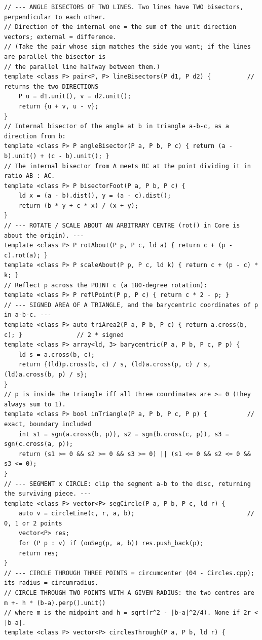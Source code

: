 \documentclass[9pt,a4paper,twocolumn]{extarticle}
\begin{document}
\begin{lstlisting}
// --- ANGLE BISECTORS OF TWO LINES. Two lines have TWO bisectors, perpendicular to each other.
// Direction of the internal one = the sum of the unit direction vectors; external = difference.
// (Take the pair whose sign matches the side you want; if the lines are parallel the bisector is
// the parallel line halfway between them.)
template <class P> pair<P, P> lineBisectors(P d1, P d2) {          // returns the two DIRECTIONS
    P u = d1.unit(), v = d2.unit();
    return {u + v, u - v};
}
// Internal bisector of the angle at b in triangle a-b-c, as a direction from b:
template <class P> P angleBisector(P a, P b, P c) { return (a - b).unit() + (c - b).unit(); }
// The internal bisector from A meets BC at the point dividing it in ratio AB : AC.
template <class P> P bisectorFoot(P a, P b, P c) {
    ld x = (a - b).dist(), y = (a - c).dist();
    return (b * y + c * x) / (x + y);
}
// --- ROTATE / SCALE ABOUT AN ARBITRARY CENTRE (rot() in Core is about the origin). ---
template <class P> P rotAbout(P p, P c, ld a) { return c + (p - c).rot(a); }
template <class P> P scaleAbout(P p, P c, ld k) { return c + (p - c) * k; }
// Reflect p across the POINT c (a 180-degree rotation):
template <class P> P reflPoint(P p, P c) { return c * 2 - p; }
// --- SIGNED AREA OF A TRIANGLE, and the barycentric coordinates of p in a-b-c. ---
template <class P> auto triArea2(P a, P b, P c) { return a.cross(b, c); }               // 2 * signed
template <class P> array<ld, 3> barycentric(P a, P b, P c, P p) {
    ld s = a.cross(b, c);
    return {(ld)p.cross(b, c) / s, (ld)a.cross(p, c) / s, (ld)a.cross(b, p) / s};
}
// p is inside the triangle iff all three coordinates are >= 0 (they always sum to 1).
template <class P> bool inTriangle(P a, P b, P c, P p) {           // exact, boundary included
    int s1 = sgn(a.cross(b, p)), s2 = sgn(b.cross(c, p)), s3 = sgn(c.cross(a, p));
    return (s1 >= 0 && s2 >= 0 && s3 >= 0) || (s1 <= 0 && s2 <= 0 && s3 <= 0);
}
// --- SEGMENT x CIRCLE: clip the segment a-b to the disc, returning the surviving piece. ---
template <class P> vector<P> segCircle(P a, P b, P c, ld r) {
    auto v = circleLine(c, r, a, b);                               // 0, 1 or 2 points
    vector<P> res;
    for (P p : v) if (onSeg(p, a, b)) res.push_back(p);
    return res;
}
// --- CIRCLE THROUGH THREE POINTS = circumcenter (04 - Circles.cpp); its radius = circumradius.
// CIRCLE THROUGH TWO POINTS WITH A GIVEN RADIUS: the two centres are m +- h * (b-a).perp().unit()
// where m is the midpoint and h = sqrt(r^2 - |b-a|^2/4). None if 2r < |b-a|.
template <class P> vector<P> circlesThrough(P a, P b, ld r) {

\end{lstlisting}
\end{document}
